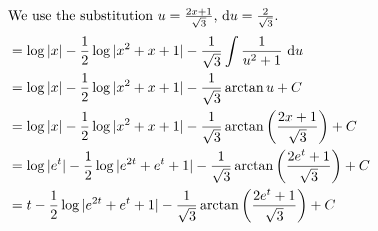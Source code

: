 \begin{solution}
\begin{align*}
\intertext{We use the substitution $u=\frac{2x+1}{\sqrt{3}}$, $\mathrm{d}u = \frac{2}{\sqrt3}$.}
&=\log|x| - \frac{1}{2}\log|x^2+x+1|-\frac{1}{\sqrt3}\int \frac{1}{u^2+1}~\mathrm{d}u
\\&=\log|x| - \frac{1}{2}\log|x^2+x+1|-\frac{1}{\sqrt3}\arctan u+C
\\&=\log|x| - \frac{1}{2}\log|x^2+x+1|-\frac{1}{\sqrt3}\arctan \left(\frac{2x+1}{\sqrt3}\right)+C
\\&=\log|e^t| - \frac{1}{2}\log|e^{2t}+e^t+1|-\frac{1}{\sqrt3}\arctan \left(\frac{2e^t+1}{\sqrt3}\right)+C
\\&=t - \frac{1}{2}\log|e^{2t}+e^t+1|-\frac{1}{\sqrt3}\arctan \left(\frac{2e^t+1}{\sqrt3}\right)+C
\end{align*}
\end{solution}



